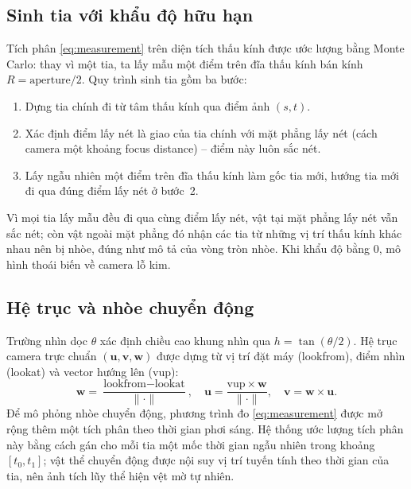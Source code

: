 \subsection{Sinh tia với khẩu độ hữu hạn}
Tích phân \eqref{eq:measurement} trên diện tích thấu kính được ước lượng bằng
Monte Carlo: thay vì một tia, ta lấy mẫu một điểm trên đĩa thấu kính bán kính
$R=\text{aperture}/2$. Quy trình sinh tia
gồm ba bước:
\begin{enumerate}[noitemsep]
  \item Dựng tia chính đi từ tâm thấu kính qua điểm ảnh $(s,t)$.
  \item Xác định điểm lấy nét là giao của tia chính với mặt phẳng lấy nét
        (cách camera một khoảng focus distance) -- điểm này luôn sắc nét.
  \item Lấy ngẫu nhiên một điểm trên đĩa thấu kính làm gốc tia mới, hướng tia mới
        đi qua đúng điểm lấy nét ở bước~2.
\end{enumerate}
Vì mọi tia lấy mẫu đều đi qua cùng điểm lấy nét, vật tại mặt phẳng lấy nét vẫn
sắc nét; còn vật ngoài mặt phẳng đó nhận các tia từ những vị trí thấu kính khác
nhau nên bị nhòe, đúng như mô tả của vòng tròn nhòe. Khi khẩu độ bằng 0, mô hình
thoái biến về camera lỗ kim.

\subsection{Hệ trục và nhòe chuyển động}
Trường nhìn dọc $\theta$ xác định chiều cao khung nhìn qua $h=\tan(\theta/2)$. Hệ
trục camera trực chuẩn $(\mathbf{u},\mathbf{v},\mathbf{w})$ được dựng từ vị trí
đặt máy (lookfrom), điểm nhìn (lookat) và vector hướng lên
(vup):
\begin{equation}
\mathbf{w} = \frac{\text{lookfrom}-\text{lookat}}{\|\cdot\|},\quad
\mathbf{u} = \frac{\text{vup}\times\mathbf{w}}{\|\cdot\|},\quad
\mathbf{v} = \mathbf{w}\times\mathbf{u}.
\end{equation}
Để mô phỏng nhòe chuyển động, phương trình đo
\eqref{eq:measurement} được mở rộng thêm một tích phân theo thời gian phơi
sáng. Hệ thống ước lượng tích phân này bằng cách gán cho mỗi tia một mốc thời
gian ngẫu nhiên trong khoảng $[t_0,t_1]$; vật thể chuyển động được nội suy vị trí
tuyến tính theo thời gian của tia, nên ảnh tích lũy thể hiện vệt mờ tự
nhiên.
